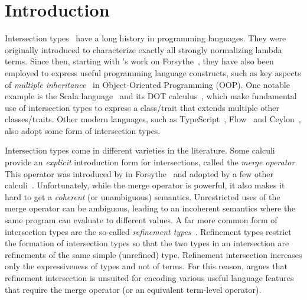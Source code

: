 
\section{Introduction}
\label{sec:intro}

Intersection types~\citep{pottinger1980type,coppo1981functional} have a long
history in programming languages. They were originally introduced to
characterize exactly all strongly normalizing lambda terms. Since then,
starting with \citeauthor{reynolds1988preliminary}'s work on
Forsythe~\citep{reynolds1988preliminary}, they have also been employed
to express useful programming language constructs, such as key
aspects of \emph{multiple inheritance}~\citep{compagnoni1996higher} in 
Object-Oriented Programming (OOP). One notable
example is the Scala
language~\citep{odersky2004overview} and its DOT
calculus~\citep{amin2012dependent}, which make fundamental use of intersection
types to express a class/trait that extends multiple other classes/traits. Other
modern languages, such as TypeScript~\citep{typescript}, Flow~\citep{flow} and
Ceylon~\citep{ceylon}, also adopt some form of intersection types.

Intersection types come in different varieties in the literature. Some calculi
provide an \emph{explicit} introduction form for intersections, called the
\emph{merge operator}. This operator was introduced by
\citeauthor{reynolds1988preliminary} in Forsythe~\citep{reynolds1988preliminary} and
adopted by a few other calculi~\citep{Castagna_1992,
  dunfield2014elaborating, oliveira2016disjoint, alpuimdisjoint}. Unfortunately,
while the merge operator is powerful, it also makes it hard to get a \emph{coherent}
(or unambiguous) semantics. 
Unrestricted uses of the merge operator can be ambiguous, leading to an incoherent semantics
where the same program can evaluate to different values. 
A far more common form of intersection types are the so-called \emph{refinement
  types}~\citep{Freeman_1991, Davies_2000, dunfield2003type}. Refinement types
restrict the formation of intersection types so that the two types in an
intersection are refinements of the same simple (unrefined) type. Refinement
intersection increases only the expressiveness of types and not of terms. 
For this reason, \citet{dunfield2014elaborating} argues that refinement
intersection is unsuited for encoding various useful language features
that require the merge operator (or an equivalent term-level operator).

